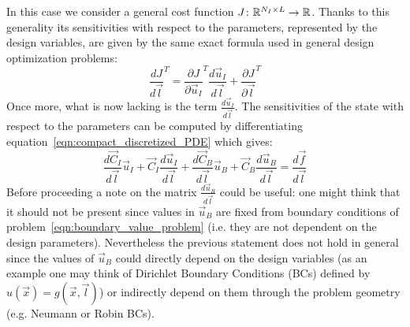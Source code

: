 In this case we consider a general cost function $J \colon \mathbb{R}^{N_I \times L} \to \mathbb{R}$. Thanks to this generality its sensitivities with respect to the parameters,  represented by the design variables, are given by the same exact formula used in general design optimization problems:
\begin{equation}
	\label{eqn:gradient_1st_step_1D_RBF-FD}
	\frac{dJ}{d\vec{l}}^T = \frac{\partial J}{\partial \vec{u}_I}^T \frac{d\vec{u}_I}{d\vec{l}} + \frac{\partial J}{\partial \vec{l}}^T
\end{equation}
Once more, what is now lacking is the term $\frac{d\vec{u}_I}{d\vec{l}}$. The sensitivities of the state with respect to the parameters can be computed by differentiating equation~\eqref{eqn:compact_discretized_PDE} which gives:
\begin{equation}
	\frac{d\vec{C}_I}{d\vec{l}} \vec{u}_I + \vec{C}_I \frac{d\vec{u}_I}{d\vec{l}} + \frac{d\vec{C}_B}{d\vec{l}} \vec{u}_B + \vec{C}_B \frac{d\vec{u}_B}{d\vec{l}} =
	\frac{d\vec{f}}{d\vec{l}}
\end{equation} 
Before proceeding a note on the matrix $\frac{d\vec{u}_B}{d\vec{l}}$ could be useful: one might think that it should not be present since values in $\vec{u}_B$ are fixed from boundary conditions of problem~\eqref{eqn:boundary_value_problem} (i.e. they are not dependent on the design parameters).
Nevertheless the previous statement does not hold in general since the values of $\vec{u}_B$ could directly depend on the design variables (as an example one may think of Dirichlet Boundary Conditions (BCs) defined by $u(\vec{x})=g(\vec{x}, \vec{l})$) or indirectly depend on them through the problem geometry (e.g. Neumann or Robin BCs).

